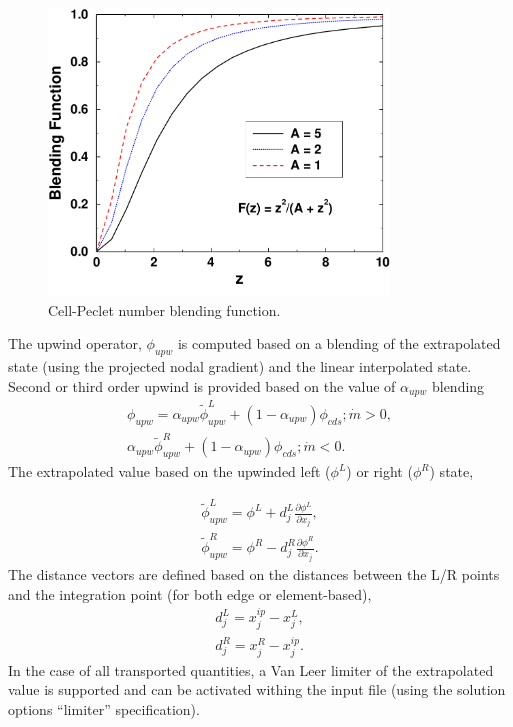 \begin{figure} [h]
\centerline{\includegraphics[height=3.0in]{images/peclet}}
\vspace{0.1in}
\caption{Cell-Peclet number blending function.}
\label{pec-blend}
\end{figure}
 
The upwind operator, $\phi_{upw}$ is computed based on a blending of the extrapolated
state (using the projected nodal gradient) and the linear interpolated state. Second 
or third order upwind is provided based on the value of $\alpha_{upw}$ blending
\begin{eqnarray}
 \phi_{upw} = \alpha_{upw}\tilde \phi^L_{upw} + \left(1-\alpha_{upw}\right)\phi_{cds}; \dot m > 0, \nonumber \\
             \alpha_{upw}\tilde\phi^R_{upw} + \left(1-\alpha_{upw}\right)\phi_{cds}; \dot m < 0.
\label{phiUpwindFull}
\end{eqnarray}
The extrapolated value based on the upwinded left ($\phi^L$) or right ($\phi^R$) state,

\begin{eqnarray}
  \tilde \phi^L_{upw} = \phi^L + d^L_j \frac{\partial \phi^L }{\partial x_j}, \nonumber \\
  \tilde \phi^R_{upw} = \phi^R - d^R_j \frac{\partial \phi^R }{\partial x_j}.
\label{advUpwLR}
\end{eqnarray}
%
The distance vectors are defined based on the distances between the L/R points and the integration point 
(for both edge or element-based),
\begin{eqnarray}
  d^L_j = x^{ip}_j - x^L_j, \nonumber \\
  d^R_j = x^R_j - x^{ip}_j. 
\end{eqnarray}
\label{distanceVec}
In the case of all transported quantities, a Van Leer limiter of the extrapolated value is supported
and can be activated withing the input file (using the solution options ``limiter'' specification).


